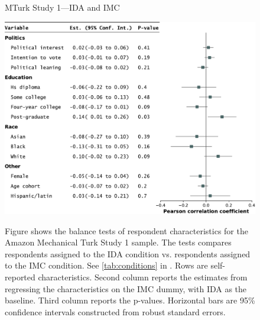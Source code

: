 \begin{center}
	\begin{figure}
		\centering
		\caption{MTurk Study 1---IDA and IMC}
		\includegraphics[width=\textwidth]{../figs/study1-baltest-14k-ips.pdf}
		\label{fig:baltest-14k-ips}
		\caption*{\footnotesize 
			Figure shows the balance tests of respondent characteristics for the Amazon Mechanical Turk Study 1 sample.
			The tests compares respondents assigned to the IDA condition vs. respondents assigned to the IMC condition.
			See \cref{tab:conditions} in .
			Rows are self-reported characteristics.
			Second column reports the estimates from regressing the characteristics on the IMC dummy, with IDA as the baseline.
			Third column reports the p-values.
			Horizontal bars are 95\% confidence intervals constructed from robust standard errors.
		}
	\end{figure}
\end{center}

